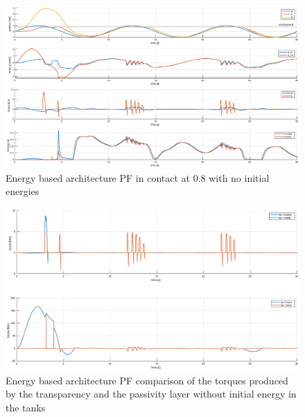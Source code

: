 \documentclass[a4paper,12pt]{article}
\begin{document}
\begin{figure}[H]
    \begin{center}
        \hspace*{-4.5cm}
        \includegraphics[scale=0.5]{images/energy_pf_no_energy.eps}
    \end{center}
    \caption{Energy based architecture PF in contact at 0.8 with no initial energies}
    \label{fig:energy_pf_no_energy}
\end{figure}

\begin{figure}[H]
    \begin{center}
        \hspace*{-4.5cm}
        \includegraphics[scale=0.5]{images/energy_pf_tau.eps}
    \end{center}
    \caption{Energy based architecture PF comparison of the torques produced by the transparency and the passivity layer without initial energy in the tanks}
    \label{fig:energy_pf_tau}
\end{figure}
\end{document}
